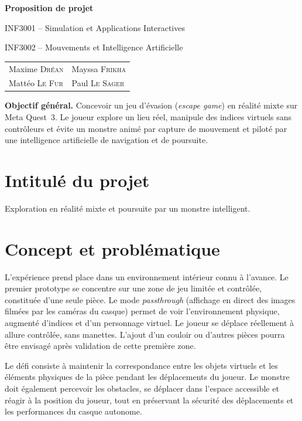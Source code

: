\documentclass[11pt,a4paper]{article}
\begin{document}
\begin{center}
    {\LARGE\bfseries Proposition de projet\par}
    \vspace{0.23cm}
    {\normalsize INF3001 -- Simulation et Applications Interactives\par}
    {\normalsize INF3002 -- Mouvements et Intelligence Artificielle\par}

    \vspace{0.54cm}
    \begin{tabular}{@{}l@{\hspace{1.25cm}}l@{}}
        Maxime \textsc{Dréan} & Mayssa \textsc{Frikha} \\[0.15cm]
        Mattéo \textsc{Le Fur} & Paul \textsc{Le Sager}
    \end{tabular}
\end{center}

\vspace{0.62cm}

\textbf{Objectif général.} Concevoir un jeu d'évasion (\emph{escape game}) en réalité mixte sur Meta Quest~3. Le joueur explore un lieu réel, manipule des indices virtuels sans contrôleurs et évite un monstre animé par capture de mouvement et piloté par une intelligence artificielle de navigation et de poursuite.

\section{Intitulé du projet}

Exploration en réalité mixte et poursuite par un monstre intelligent.

\section{Concept et problématique}

L'expérience prend place dans un environnement intérieur connu à l'avance. Le premier prototype se concentre sur une zone de jeu limitée et contrôlée, constituée d'une seule pièce. Le mode \emph{passthrough} (affichage en direct des images filmées par les caméras du casque) permet de voir l'environnement physique, augmenté d'indices et d'un personnage virtuel. Le joueur se déplace réellement à allure contrôlée, sans manettes. L'ajout d'un couloir ou d'autres pièces pourra être envisagé après validation de cette première zone.

Le défi consiste à maintenir la correspondance entre les objets virtuels et les éléments physiques de la pièce pendant les déplacements du joueur. Le monstre doit également percevoir les obstacles, se déplacer dans l'espace accessible et réagir à la position du joueur, tout en préservant la sécurité des déplacements et les performances du casque autonome.
\end{document}
